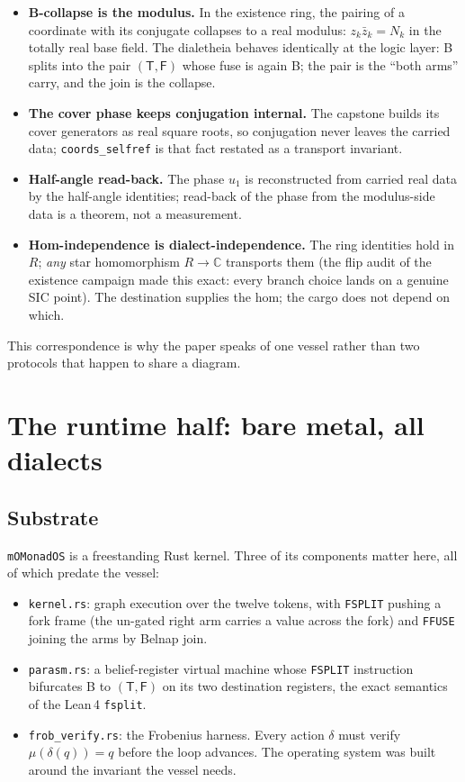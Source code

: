 \documentclass[12pt,a4paper]{article}
\newcommand{\Lean}{\textsf{Lean}\,4}
\newcommand{\bT}{\textsf{T}}
\newcommand{\bF}{\textsf{F}}
\newcommand{\bB}{\textsf{B}}
\begin{document}
\begin{itemize}
\item \textbf{B-collapse is the modulus.} In the existence ring, the
pairing of a coordinate with its conjugate collapses to a real modulus:
$z_k \bar{z}_k = N_k$ in the totally real base field. The dialetheia
behaves identically at the logic layer: \bB{} splits into the pair
$(\bT, \bF)$ whose fuse is again \bB{}; the pair is the ``both arms''
carry, and the join is the collapse.
\item \textbf{The cover phase keeps conjugation internal.} The capstone
builds its cover generators as real square roots, so conjugation never
leaves the carried data; \texttt{coords\_selfref} is that fact restated
as a transport invariant.
\item \textbf{Half-angle read-back.} The phase $u_1$ is reconstructed
from carried real data by the half-angle identities; read-back of the
phase from the modulus-side data is a theorem, not a measurement.
\item \textbf{Hom-independence is dialect-independence.} The ring
identities hold in $R$; \emph{any} star homomorphism $R \to \mathbb{C}$
transports them (the flip audit of the existence campaign made this
exact: every branch choice lands on a genuine SIC point). The
destination supplies the hom; the cargo does not depend on which.
\end{itemize}

This correspondence is why the paper speaks of one vessel rather than two
protocols that happen to share a diagram.

\section{The runtime half: bare metal, all dialects}
\label{sec:runtime}

\subsection{Substrate}

\texttt{mOMonadOS} is a freestanding Rust kernel. Three of its components
matter here, all of which predate the vessel:
\begin{itemize}
\item \texttt{kernel.rs}: graph execution over the twelve tokens, with
\texttt{FSPLIT} pushing a fork frame (the un-gated right arm carries a
value across the fork) and \texttt{FFUSE} joining the arms by Belnap
join.
\item \texttt{parasm.rs}: a belief-register virtual machine whose
\texttt{FSPLIT} instruction bifurcates \bB{} to $(\bT, \bF)$ on its two
destination registers, the exact semantics of the \Lean{}
\texttt{fsplit}.
\item \texttt{frob\_verify.rs}: the Frobenius harness. Every action
$\delta$ must verify $\mu(\delta(q)) = q$ before the loop advances.
The operating system was built around the invariant the vessel needs.
\end{itemize}
\end{document}
